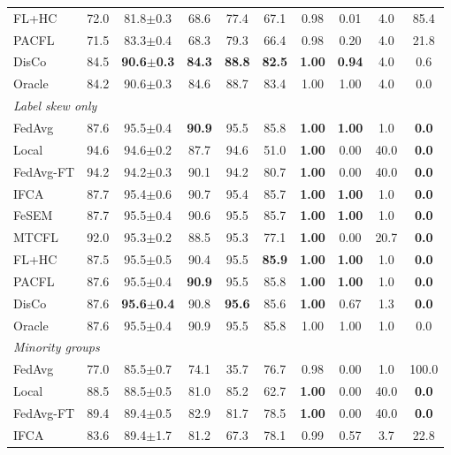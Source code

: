 \begin{tabular}{lccccccccc}
FL+HC & 72.0 & 81.8$\pm$0.3 & 68.6 & 77.4 & 67.1 & 0.98 & 0.01 & 4.0 & 85.4 \\
PACFL & 71.5 & 83.3$\pm$0.4 & 68.3 & 79.3 & 66.4 & 0.98 & 0.20 & 4.0 & 21.8 \\
DisCo & 84.5 & \textbf{90.6$\pm$0.3} & \textbf{84.3} & \textbf{88.8} & \textbf{82.5} & \textbf{1.00} & \textbf{0.94} & 4.0 & 0.6 \\
Oracle & 84.2 & 90.6$\pm$0.3 & 84.6 & 88.7 & 83.4 & 1.00 & 1.00 & 4.0 & 0.0 \\
\midrule
\multicolumn{10}{l}{\textit{Label skew only}}\\
FedAvg & 87.6 & 95.5$\pm$0.4 & \textbf{90.9} & 95.5 & 85.8 & \textbf{1.00} & \textbf{1.00} & 1.0 & \textbf{0.0} \\
Local & 94.6 & 94.6$\pm$0.2 & 87.7 & 94.6 & 51.0 & \textbf{1.00} & 0.00 & 40.0 & \textbf{0.0} \\
FedAvg-FT & 94.2 & 94.2$\pm$0.3 & 90.1 & 94.2 & 80.7 & \textbf{1.00} & 0.00 & 40.0 & \textbf{0.0} \\
IFCA & 87.7 & 95.4$\pm$0.6 & 90.7 & 95.4 & 85.7 & \textbf{1.00} & \textbf{1.00} & 1.0 & \textbf{0.0} \\
FeSEM & 87.7 & 95.5$\pm$0.4 & 90.6 & 95.5 & 85.7 & \textbf{1.00} & \textbf{1.00} & 1.0 & \textbf{0.0} \\
MTCFL & 92.0 & 95.3$\pm$0.2 & 88.5 & 95.3 & 77.1 & \textbf{1.00} & 0.00 & 20.7 & \textbf{0.0} \\
FL+HC & 87.5 & 95.5$\pm$0.5 & 90.4 & 95.5 & \textbf{85.9} & \textbf{1.00} & \textbf{1.00} & 1.0 & \textbf{0.0} \\
PACFL & 87.6 & 95.5$\pm$0.4 & \textbf{90.9} & 95.5 & 85.8 & \textbf{1.00} & \textbf{1.00} & 1.0 & \textbf{0.0} \\
DisCo & 87.6 & \textbf{95.6$\pm$0.4} & 90.8 & \textbf{95.6} & 85.6 & \textbf{1.00} & 0.67 & 1.3 & \textbf{0.0} \\
Oracle & 87.6 & 95.5$\pm$0.4 & 90.9 & 95.5 & 85.8 & 1.00 & 1.00 & 1.0 & 0.0 \\
\midrule
\multicolumn{10}{l}{\textit{Minority groups}}\\
FedAvg & 77.0 & 85.5$\pm$0.7 & 74.1 & 35.7 & 76.7 & 0.98 & 0.00 & 1.0 & 100.0 \\
Local & 88.5 & 88.5$\pm$0.5 & 81.0 & 85.2 & 62.7 & \textbf{1.00} & 0.00 & 40.0 & \textbf{0.0} \\
FedAvg-FT & 89.4 & 89.4$\pm$0.5 & 82.9 & 81.7 & 78.5 & \textbf{1.00} & 0.00 & 40.0 & \textbf{0.0} \\
IFCA & 83.6 & 89.4$\pm$1.7 & 81.2 & 67.3 & 78.1 & 0.99 & 0.57 & 3.7 & 22.8 \\

\end{tabular}
